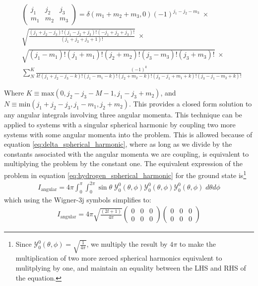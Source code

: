         \begin{align}
            &\begin{pmatrix}
                j_1 & j_2 & j_3\\
                m_1 & m_2 & m_3
            \end{pmatrix} = \delta(m_1 + m_2 + m_3, 0) (-1)^{j_1 - j_2 - m_3} \;\times \\
            & \sqrt{\frac{(j_1 + j_2 - j_3)! (j_1 - j_2 + j_3)!(-j_1 + j_2 + j_3)!}{(j_1 + j_2 + j_3 + 1)!}} \;\times \nonumber \\
            &\sqrt{(j_1 - m_1)!(j_1 + m_1)!(j_2 + m_2)!(j_3 - m_3)! (j_3 + m_3)!} \;\times \nonumber\\
             &\sum_{N}^{K} \frac{(-1)^k}{k!(j_1 + j_2 - j_3 - k)!(j_1 - m_1 - k)!(j_2  + m_2 - k)!(j_3 - j_1 + m_1 + k)!(j_3 - j_1 - m_2 + k)!}\nonumber
        \end{align}

        \noindent Where $K \equiv \text{max}(0, j_2 - j_3 - M-1, j_1 - j_3 + m_2)$, and $N \equiv \text{min}(j_1 + j_2 - j_3, j_1 - m_1, j_2 + m_2)$. This provides a closed form solution to any angular integrals involving three angular momenta. This technique can be applied to systems with a singular spherical harmonic by coupling two more systems with some angular momenta into the problem. This is allowed because of equation \eqref{eq:delta_spherical_harmonic}, where as long as we divide by the constants associated with the angular momenta we are coupling, is equivalent to multiplying the problem by the constant one. The equivalent expression of the problem in equation \eqref{eq:hydrogen_spherical_harmonic} for the ground state is\footnote{Since $\mathcal{Y}^0_0 (\theta, \phi) = \sqrt{\frac{1}{4\pi}}$, we multiply the result by $4\pi$ to make the multiplication of two more zeroed spherical harmonics equivalent to mulitplying by one, and maintain an equality between the LHS and RHS of the equation.}
            \begin{align}
                I_{\text{angular}} = 4\pi \int_0^\pi \int_0^{2\pi}\sin \theta \;\mathcal{Y}^0_0 (\theta, \phi) \mathcal{Y}^0_0 (\theta, \phi) \mathcal{Y}^0_0 (\theta, \phi)\; d\theta d\phi
            \end{align}
        which using the Wigner-3j symbols simplifies to:
        \begin{align}
            I_{\text{angular}} = 4\pi \sqrt{\frac{(2l + 1)}{4 \pi}} \begin{pmatrix}
                0 & 0 & 0 \\
                0 & 0 & 0
            \end{pmatrix} \begin{pmatrix}
                0 & 0 & 0 \\
                0 & 0 & 0 
            \end{pmatrix} \nonumber
        \end{align}

